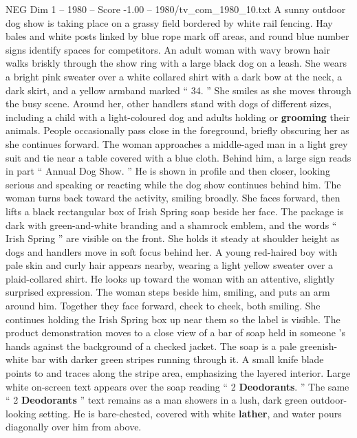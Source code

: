 \begin{textsample}{NEG Dim 1 – 1980 – Score -1.00 – 1980/tv\_com\_1980\_10.txt}  \label{ex:f1_neg_048}
A sunny outdoor dog show is taking place on a grassy field bordered by white rail fencing.
Hay bales and white posts linked by blue rope mark off areas, and round blue number signs identify spaces for competitors.
An adult woman with wavy brown hair walks briskly through the show ring with a large black dog on a leash.
She wears a bright pink sweater over a white collared shirt with a dark bow at the neck, a dark skirt, and a yellow armband marked “ 34. ” She smiles as she moves through the busy scene.
Around her, other handlers stand with dogs of different sizes, including a child with a light-coloured dog and adults holding or \textbf{grooming} their animals.
People occasionally pass close in the foreground, briefly obscuring her as she continues forward.
The woman approaches a middle-aged man in a light grey suit and tie near a table covered with a blue cloth.
Behind him, a large sign reads in part “ Annual Dog Show. ” He is shown in profile and then closer, looking serious and speaking or reacting while the dog show continues behind him.
The woman turns back toward the activity, smiling broadly.
She faces forward, then lifts a black rectangular box of Irish Spring soap beside her face.
The package is dark with green-and-white branding and a shamrock emblem, and the words “ Irish Spring ” are visible on the front.
She holds it steady at shoulder height as dogs and handlers move in soft focus behind her.
A young red-haired boy with pale skin and curly hair appears nearby, wearing a light yellow sweater over a plaid-collared shirt.
He looks up toward the woman with an attentive, slightly surprised expression.
The woman steps beside him, smiling, and puts an arm around him.
Together they face forward, cheek to cheek, both smiling.
She continues holding the Irish Spring box up near them so the label is visible.
The product demonstration moves to a close view of a bar of soap held in someone ’s hands against the background of a checked jacket.
The soap is a pale greenish-white bar with darker green stripes running through it.
A small knife blade points to and traces along the stripe area, emphasizing the layered interior.
Large white on-screen text appears over the soap reading “ 2 \textbf{Deodorants}. ” The same “ 2 \textbf{Deodorants} ” text remains as a man showers in a lush, dark green outdoor-looking setting.
He is bare-chested, covered with white \textbf{lather}, and water pours diagonally over him from above.

\end{textsample}
